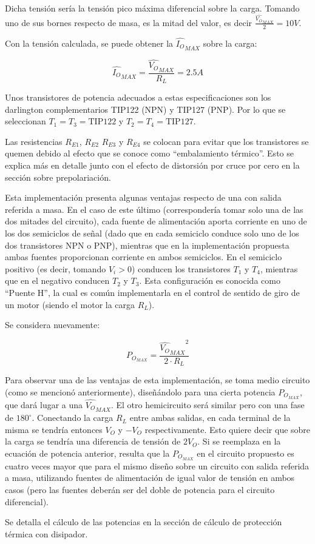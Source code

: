 Dicha tensión sería la tensión pico máxima diferencial sobre la carga. Tomando uno de sus bornes respecto de masa, es la mitad del valor, es decir $\frac{\hat{V_O}_{MAX}}{2} = 10V$.\par
Con la tensión calculada, se puede obtener la $\hat{I_O}_{MAX}$ sobre la carga:

\[
\hat{I_O}_{MAX} = \frac{\hat{V_O}_{MAX}}{R_L} = 2.5A
\]

Unos transistores de potencia adecuados a estas especificaciones son los darlington complementarios TIP122 (NPN) y TIP127 (PNP). Por lo que se seleccionan $T_1 = T_3 = \textrm{TIP122}$ y $T_2 = T_4 = \textrm{TIP127}$.\par
Las resistencias $R_{E1}$, $R_{E2}$ $R_{E3}$ y $R_{E4}$ se colocan para evitar que los transistores se quemen debido al efecto que se conoce como ``embalamiento térmico''. Esto se explica más en detalle junto con el efecto de distorsión por cruce por cero en la sección sobre prepolariación.


Esta implementación presenta algunas ventajas respecto de una con salida referida a masa. En el caso de este último (correspondería tomar solo una de las dos mitades del circuito), cada fuente de alimentación aporta corriente en uno de los dos semiciclos de señal (dado que en cada semiciclo conduce solo uno de los dos transistores NPN o PNP), mientras que en la implementación propuesta ambas fuentes proporcionan corriente en ambos semiciclos. En el semiciclo positivo (es decir, tomando $V_i > 0$) conducen los transistores $T_1$ y $T_4$, mientras que en el negativo conducen $T_2$ y $T_3$. Esta configuración es conocida como ``Puente H'', la cual es común implementarla en el control de sentido de giro de un motor (siendo el motor la carga $R_L$).\par
Se considera nuevamente:

\[
P_{O_{MAX}} = \frac{{\hat{V_O}_{MAX}}^2}{2 \cdot R_L}
\]

Para observar una de las ventajas de esta implementación, se toma medio circuito (como se mencionó anteriormente), diseñándolo para una cierta potencia $P_{O_{MAX}}$, que dará lugar a una $\hat{V_O}_{MAX}$. El otro hemicircuito será similar pero con una fase de $180^{\circ}$. Conectando la carga $R_L$ entre ambas salidas, en cada terminal de la misma se tendría entonces $V_O$ y $-V_O$ respectivamente. Esto quiere decir que sobre la carga se tendría una diferencia de tensión de $2V_O$. Si se reemplaza en la ecuación de potencia anterior, resulta que la $P_{O_{MAX}}$ en el circuito propuesto es cuatro veces mayor que para el mismo diseño sobre un circuito con salida referida a masa, utilizando fuentes de alimentación de igual valor de tensión en ambos casos (pero las fuentes deberán ser del doble de potencia para el circuito diferencial).\par
Se detalla el cálculo de las potencias en la sección de cálculo de protección térmica con disipador.

